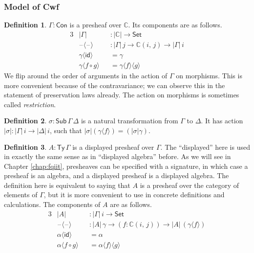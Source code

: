 \documentclass[12pt,a4paper,twoside,openany]{book}
\theoremstyle{remark}
\theoremstyle{definition}
\newtheorem{mydefinition}{Definition}
\newcommand{\mbb}[1]{\mathbb{#1}}
\newcommand{\id}{\mathsf{id}}
\newcommand{\Con}{\mathsf{Con}}
\newcommand{\Sub}{\mathsf{Sub}}
\newcommand{\Ty}{\mathsf{Ty}}
\newcommand{\blank}{\mathord{\hspace{1pt}\text{--}\hspace{1pt}}}
\newcommand{\Set}{\mathsf{Set}}
\newcommand{\mbbC}{\mbb{C}}
\newcommand{\lab}{\langle}
\newcommand{\rab}{\rangle}
\begin{document}
\subsubsection{Model of Cwf}

\begin{mydefinition}
$\Gamma : \Con$ is a presheaf over $\mbbC$. Its components
are as follows.
\begin{alignat*}{3}
  & |\Gamma|             &&: |\mbbC| \to \Set \\
  & \blank\lab\blank\rab &&: |\Gamma|\,j \to \mbbC(i,\,j) \to |\Gamma|\,i\\
  & \gamma\lab\id\rab &&= \gamma \\
  & \gamma\lab f\circ g\rab &&= \gamma \lab f \rab \lab g \rab
\end{alignat*}
We flip around the order of arguments in the action of $\Gamma$ on
morphisms. This is more convenient because of the contravariance; we can observe
this in the statement of preservation laws already. The action on morphisms is
sometimes called \emph{restriction}.
\end{mydefinition}

\begin{mydefinition}
$\sigma : \Sub\,\Gamma\,\Delta$ is a natural transformation from $\Gamma$ to
$\Delta$. It has action $|\sigma| : |\Gamma|\,i \to |\Delta|\,i$, such that
$|\sigma|(\gamma\lab f \rab) = (|\sigma|\gamma)$.
\end{mydefinition}

\begin{mydefinition}
$A : \Ty\,\Gamma$ is a displayed presheaf over $\Gamma$. The
``displayed'' here is used in exactly the same sense as in ``displayed
algebra'' before. As we will see in Chapter \ref{chap:fqiit}, presheaves can be
specified with a signature, in which case a presheaf is an algebra, and a
displayed presheaf is a displayed algebra. The definition here is equivalent
to saying that $A$ is a presheaf over the category of elements of $\Gamma$,
but it is more convenient to use in concrete definitions and calculations. The
components of $A$ are as follows.
\begin{alignat*}{3}
  &|A| &&: |\Gamma|\,i \to \Set\\
  &\blank\lab\blank\rab &&: |A|\,\gamma \to (f : \mbbC(i,\,j)) \to |A|\,(\gamma\lab f \rab)\\
  & \alpha\lab\id\rab &&= \alpha \\
  & \alpha\lab f\circ g\rab &&= \alpha \lab f \rab \lab g \rab
\end{alignat*}
\end{mydefinition}
\end{document}

